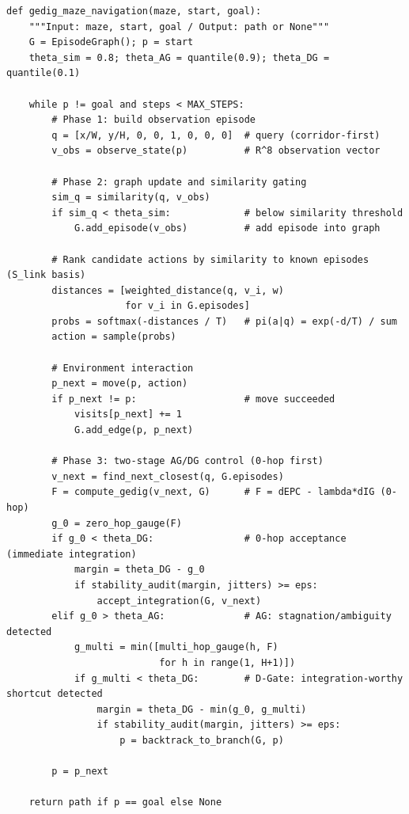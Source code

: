 \documentclass[ja=standard,xelatex]{bxjsarticle}
\begin{document}
\begin{algorithm}[H]
\caption{geDIG による部分観測迷路探索（Python風擬似コード）}
\label{alg:maze_gedig}
\footnotesize
\begin{verbatim}
def gedig_maze_navigation(maze, start, goal):
    """Input: maze, start, goal / Output: path or None"""
    G = EpisodeGraph(); p = start
    theta_sim = 0.8; theta_AG = quantile(0.9); theta_DG = quantile(0.1)

    while p != goal and steps < MAX_STEPS:
        # Phase 1: build observation episode
        q = [x/W, y/H, 0, 0, 1, 0, 0, 0]  # query (corridor-first)
        v_obs = observe_state(p)          # R^8 observation vector

        # Phase 2: graph update and similarity gating
        sim_q = similarity(q, v_obs)
        if sim_q < theta_sim:             # below similarity threshold
            G.add_episode(v_obs)          # add episode into graph

        # Rank candidate actions by similarity to known episodes (S_link basis)
        distances = [weighted_distance(q, v_i, w)
                     for v_i in G.episodes]
        probs = softmax(-distances / T)   # pi(a|q) = exp(-d/T) / sum
        action = sample(probs)

        # Environment interaction
        p_next = move(p, action)
        if p_next != p:                   # move succeeded
            visits[p_next] += 1
            G.add_edge(p, p_next)

        # Phase 3: two-stage AG/DG control (0-hop first)
        v_next = find_next_closest(q, G.episodes)
        F = compute_gedig(v_next, G)      # F = dEPC - lambda*dIG (0-hop)
        g_0 = zero_hop_gauge(F)
        if g_0 < theta_DG:                # 0-hop acceptance (immediate integration)
            margin = theta_DG - g_0
            if stability_audit(margin, jitters) >= eps:
                accept_integration(G, v_next)
        elif g_0 > theta_AG:              # AG: stagnation/ambiguity detected
            g_multi = min([multi_hop_gauge(h, F)
                           for h in range(1, H+1)])
            if g_multi < theta_DG:        # D-Gate: integration-worthy shortcut detected
                margin = theta_DG - min(g_0, g_multi)
                if stability_audit(margin, jitters) >= eps:
                    p = backtrack_to_branch(G, p)

        p = p_next

    return path if p == goal else None
\end{verbatim}
\end{algorithm}
\end{document}
